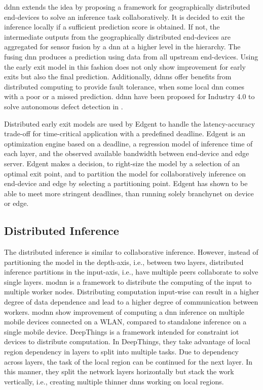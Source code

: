 \begin{enumdescript}
	\gls{ddnn} \cite{teerapittayanon_distributed_2017} extends the idea by proposing a framework for geographically distributed end-devices to solve an inference task collaboratively. It is decided to exit the inference locally if a sufficient prediction score is obtained. If not, the intermediate outputs from the geographically distributed end-devices are aggregated for sensor fusion by a \gls{dnn} at a higher level in the hierarchy. The fusing \gls{dnn} produces a prediction using data from all upstream end-devices. Using the early exit model in this fashion does not only show improvement for early exits but also the final prediction. Additionally, \gls{ddnn}s offer benefits from distributed computing to provide fault tolerance, when some local \gls{dnn} comes with a poor or a missed prediction. \gls{ddnn} have been proposed for Industry 4.0 to solve autonomous defect detection in \cite{li_deep_2018}. 
	
	Distributed early exit models are used by Edgent \cite{li_edge_2018} to handle the latency-accuracy trade-off for time-critical application with a predefined deadline. Edgent is an optimization engine based on a deadline, a regression model of inference time of each layer, and the observed available bandwidth between end-device and edge server. Edgent makes a decision, to right-size the model by a selection of an optimal exit point, and to partition the model for collaboratively inference on end-device and edge by selecting a partitioning point. Edgent has shown to be able to meet more stringent deadlines, than running solely \gls{branchynet} on device or edge.
\end{enumdescript}

\subsection{Distributed Inference}

The distributed inference is similar to collaborative inference. However, instead of partitioning the model in the depth-axis, i.e., between two layers, distributed inference partitions in the input-axis, i.e., have multiple peers collaborate to solve single layers. \gls{modnn} \cite{mao_modnn:_2017} is a framework to distribute the computing of the input to multiple worker nodes. Distributing computation input-wise can result in a higher degree of data dependence and lead to a higher degree of communication between workers. \gls{modnn} show improvement of computing a \gls{dnn} inference on multiple mobile devices connected on a WLAN, compared to standalone inference on a single mobile device. DeepThings \cite{zhao_deepthings:_2018} is a framework intended for constraint \gls{iot} devices to distribute computation. In DeepThings, they take advantage of local region dependency in layers to split into multiple tasks. Due to dependency across layers, the task of the local region can be continued for the next layer. In this manner, they split the network layers horizontally but stack the work vertically, i.e., creating multiple thinner \gls{dnn}s working on local regions.

